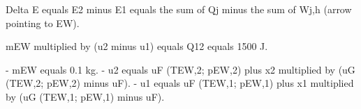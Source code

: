 Delta E equals E2 minus E1 equals the sum of Qj minus the sum of Wj,h (arrow pointing to EW).  

mEW multiplied by (u2 minus u1) equals Q12 equals 1500 J.  

- mEW equals 0.1 kg.  
- u2 equals uF (TEW,2; pEW,2) plus x2 multiplied by (uG (TEW,2; pEW,2) minus uF).  
- u1 equals uF (TEW,1; pEW,1) plus x1 multiplied by (uG (TEW,1; pEW,1) minus uF).